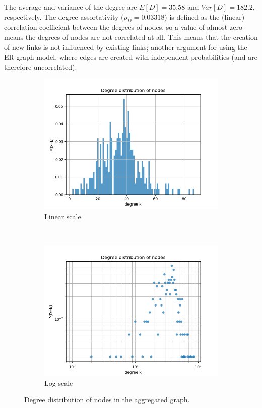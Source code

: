 \documentclass[letterpaper]{article}
\begin{document}
The average and variance of the degree are \(E[D]=35.58\) and \(Var[D]=182.2\), respectively. The degree assortativity (\(\rho_D=0.03318\)) is defined as the (linear) correlation coefficient between the degrees of nodes, so a value of almost zero means the degrees of nodes are not correlated at all. This means that the creation of new links is not influenced by existing links; another argument for using the ER graph model, where edges are created with independent probabilities (and are therefore uncorrelated).

\begin{figure}
    \centering
    \begin{subfigure}[b]{0.45\textwidth}
        \includegraphics[width=\textwidth]{img/degree_distribution.png}
        \caption{Linear scale}
	    \label{fig:degree_distribution_linlin}
    \end{subfigure}
    ~ %
    \begin{subfigure}[b]{0.45\textwidth}
        \includegraphics[width=\textwidth]{img/degree_distribution_loglog.png}
        \caption{Log scale}
	    \label{fig:degree_distribution_loglog}
    \end{subfigure}
    \caption{Degree distribution of nodes in the aggregated graph.}
    \label{fig:degree_distribution_aggregated}
\end{figure}
\end{document}
